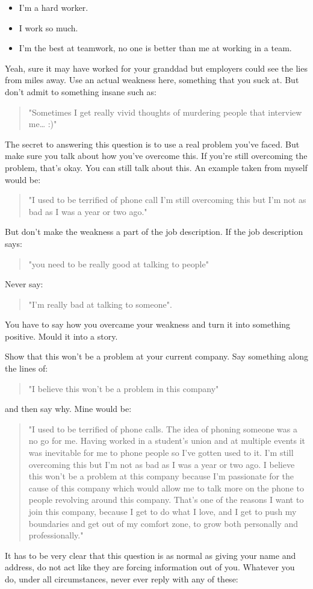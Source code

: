 \documentclass{article}
\begin{document}
\begin{itemize}
\item
  I'm a hard worker.
\item
  I work so much.
\item
  I'm the best at teamwork, no one is better than me at working in a
  team.
\end{itemize}
Yeah, sure it may have worked for your granddad but employers could see
the lies from miles away. Use an actual weakness here, something that
you suck at. But don't admit to something insane such as:
\begin{quote}
    "Sometimes I get really vivid thoughts of murdering people that
interview me\ldots{} :)"
\end{quote}
The secret to answering this question is to use a real problem you've
faced. But make sure you talk about how you've overcome this. If you're
still overcoming the problem, that's okay. You can still talk about
this. An example taken from myself would be:
\begin{quote}
    "I used to be terrified of phone call I'm still overcoming this but I'm
not as bad as I was a year or two ago."
\end{quote}
But don't make the weakness a part of the job description. If the job
description says:
\begin{quote}
    "you need to be really good at talking to people"
\end{quote}
Never say:
\begin{quote}
    "I'm really bad at talking to someone".
\end{quote}

You have to say how you overcame your weakness and turn it into
something positive. Mould it into a story.

Show that this won't be a problem at your current company. Say something
along the lines of:
\begin{quote}
    "I believe this won't be a problem in this company"
\end{quote}
and then say why. Mine would be:

\begin{quote}
    "I used to be terrified of phone calls. The idea of phoning someone was
a no go for me. Having worked in a student's union and at multiple
events it was inevitable for me to phone people so I've gotten used to
it. I'm still overcoming this but I'm not as bad as I was a year or two
ago. I believe this won't be a problem at this company because I'm
passionate for the cause of this company which would allow me to talk
more on the phone to people revolving around this company. That's one of
the reasons I want to join this company, because I get to do what I
love, and I get to push my boundaries and get out of my comfort zone, to
grow both personally and professionally."
\end{quote}
It has to be very clear that this question is as normal as giving your
name and address, do not act like they are forcing information out of
you. Whatever you do, under all circumstances, never ever reply with any
of these:
\end{document}

